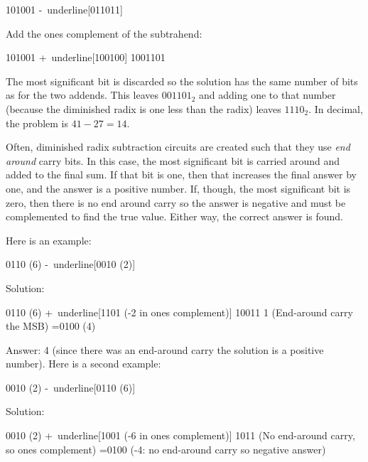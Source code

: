 \begin{binDisp}[commandchars=~\[\]]
      101001
     -~underline[011011]
\end{binDisp}

Add the ones complement of the subtrahend:

\begin{binDisp}[commandchars=~\[\]]
      101001
     +~underline[100100]
     1001101
\end{binDisp}

The most significant bit is discarded so the solution has the same number of bits as for the two addends. This leaves $ 001101_2 $ and adding one to that number (because the diminished radix is one less than the radix) leaves $ 1110_2 $. In decimal, the problem is $ 41-27=14 $.

Often, diminished radix subtraction circuits are created such that they use \emph{end around} carry bits. In this case, the most significant bit is carried around and added to the final sum. If that bit is one, then that increases the final answer by one, and the answer is a positive number. If, though, the most significant bit is zero, then there is no end around carry so the answer is negative and must be complemented to find the true value. Either way, the correct answer is found. 

Here is an example:

\begin{binDisp}[commandchars=~\[\]]
      0110  (6)
     -~underline[0010  (2)]
\end{binDisp}

Solution:

\begin{binDisp}[commandchars=~\[\]]
      0110  (6)
     +~underline[1101  (-2 in ones complement)]
     10011
         1  (End-around carry the MSB)
     =0100  (4)
\end{binDisp}

Answer: 4 (since there was an end-around carry the solution is a positive number). Here is a second example:

\begin{binDisp}[commandchars=~\[\], samepage=true]
      0010  (2)
     -~underline[0110  (6)]
\end{binDisp}

Solution:

\begin{binDisp}[commandchars=~\[\], samepage=true]
      0010  (2)
     +~underline[1001  (-6 in ones complement)]
      1011  (No end-around carry, so ones complement)
     =0100  (-4: no end-around carry so negative answer)
\end{binDisp}

